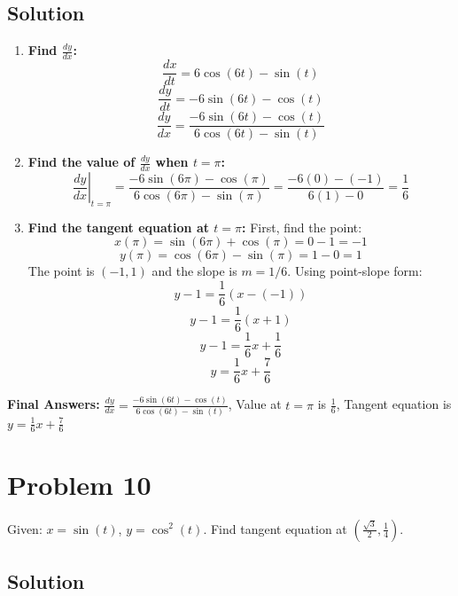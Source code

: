 \documentclass{article}
\begin{document}
\subsection*{Solution}
\begin{enumerate}
    \item \textbf{Find $\frac{dy}{dx}$:}
    \[ \frac{dx}{dt} = 6\cos(6t) - \sin(t) \]
    \[ \frac{dy}{dt} = -6\sin(6t) - \cos(t) \]
    \[ \frac{dy}{dx} = \frac{-6\sin(6t) - \cos(t)}{6\cos(6t) - \sin(t)} \]
    \item \textbf{Find the value of $\frac{dy}{dx}$ when $t=\pi$:}
    \[ \left.\frac{dy}{dx}\right|_{t=\pi} = \frac{-6\sin(6\pi) - \cos(\pi)}{6\cos(6\pi) - \sin(\pi)} = \frac{-6(0) - (-1)}{6(1) - 0} = \frac{1}{6} \]
    \item \textbf{Find the tangent equation at $t=\pi$:}
    First, find the point:
    \[ x(\pi) = \sin(6\pi) + \cos(\pi) = 0 - 1 = -1 \]
    \[ y(\pi) = \cos(6\pi) - \sin(\pi) = 1 - 0 = 1 \]
    The point is $(-1, 1)$ and the slope is $m = 1/6$.
    Using point-slope form:
    \[ y - 1 = \frac{1}{6}(x - (-1)) \]
    \[ y - 1 = \frac{1}{6}(x + 1) \]
    \[ y - 1 = \frac{1}{6}x + \frac{1}{6} \]
    \[ y = \frac{1}{6}x + \frac{7}{6} \]
\end{enumerate}
\textbf{Final Answers:}
$\frac{dy}{dx} = \frac{-6\sin(6t) - \cos(t)}{6\cos(6t) - \sin(t)}$,
Value at $t=\pi$ is $\frac{1}{6}$,
Tangent equation is $y = \frac{1}{6}x + \frac{7}{6}$

\section{Problem 10}
Given: $x = \sin(t)$, $y = \cos^2(t)$. Find tangent equation at $(\frac{\sqrt{3}}{2}, \frac{1}{4})$.

\subsection*{Solution}
\end{document}
